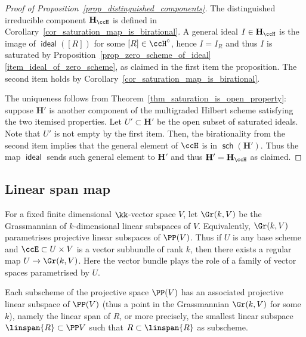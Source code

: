 \documentclass[12pt,a4paper]{article}
\DeclareMathOperator{\sch}{\mathsf {sch}}
\DeclareMathOperator{\idealmap}{\mathsf {ideal}}
\begin{document}
\begin{proof}[Proof of Proposition~\ref{prop_distinguished_components}]
   The distinguished irreducible
   component $\mathbf{H}_{\ccH}$
   is defined in Corollary~\ref{cor_saturation_map_is_birational}.
   A general ideal $I\in \mathbf{H}_{\ccH}$
     is the image of $\idealmap([R])$ for some
     $[R]\in \ccH^{\circ}$, hence $I=I_R$ and thus $I$ is saturated by Proposition~\ref{prop_zero_scheme_of_ideal}\ref{item_ideal_of_zero_scheme}, as claimed in the first item the proposition.
   The second item holds by Corollary~\ref{cor_saturation_map_is_birational}.

   The uniqueness follows from Theorem~\ref{thm_saturation_is_open_property}:    suppose $\mathbf{H}'$ is another component of the multigraded
      Hilbert scheme satisfying the two itemised properties.
   Let $U' \subset \mathbf{H}'$ be the open subset of saturated ideals.
   Note that $U'$ is not empty by the first item.
   Then, the birationality from the second item implies
      that the general element of $\ccH$ is in $\sch(\mathbf{H}')$.
   Thus the map $\idealmap$ sends such general element to
      $\mathbf{H}'$ and thus $\mathbf{H}'=\mathbf{H}_{\ccH}$ as claimed.
\end{proof}

\subsection{Linear span map}
\label{sec_linear_span_map}
For a fixed finite dimensional $\kk$-vector space $V$,
let $\Gr(k, V)$ be the Grassmannian of $k$-dimensional linear subspaces of $V$.
Equivalently, $\Gr(k, V)$ parametrises projective linear subspaces of $\PP(V)$.
Thus if $U$ is any base scheme and $\ccE\subset U\times V$ is a vector subbundle of rank $k$, then there exists a regular map $U\to \Gr(k,V)$.
Here the vector bundle plays the role of a family of vector spaces parametrised by $U$.

Each subscheme of the projective space $\PP(V)$ has an associated projective linear subspace of $\PP(V)$ (thus a point in the Grassmannian $\Gr(k, V)$ for some $k$), namely the linear span of $R$, or more precisely, the smallest linear subspace $\linspan{R}\subset \PP V$ such that $R\subset \linspan{R}$ as subscheme.
\end{document}
